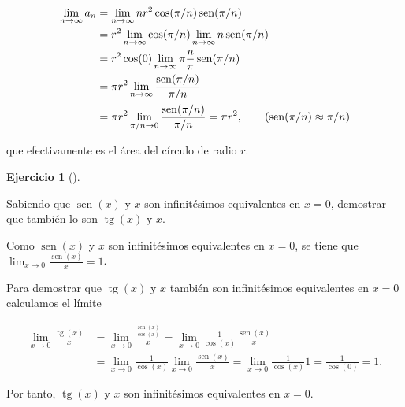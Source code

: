 \documentclass[
  a4paper,
]{scrreport}
\theoremstyle{definition}
\newtheorem{exercise}{Ejercicio}[chapter]
\theoremstyle{remark}
\begin{document}
\begin{tcolorbox}
\begin{enumerate}
  \begin{align*}
   \lim_{n\to\infty} a_n &= \lim_{n\to\infty} n r^2\cos(\pi/n)\operatorname{sen}(\pi/n)\\ 
   &= r^2 \lim_{n\to\infty}\cos(\pi/n)\lim_{n\to\infty}n\operatorname{sen}(\pi/n) \\ 
   &= r^2 \cos(0)\lim_{n\to\infty}\pi\frac{n}{\pi}\operatorname{sen}(\pi/n) \\ 
   &= \pi r^2 \lim_{n\to\infty}\frac{\operatorname{sen}(\pi/n)}{\pi/n} \\
   &= \pi r^2 \lim_{\pi/n\to 0} \frac{\operatorname{sen}(\pi/n)}{\pi/n} = \pi r^2, \tag{$\operatorname{sen}(\pi/n)\approx \pi/n$}
   \end{align*}

  que efectivamente es el área del círculo de radio \(r\).
\end{enumerate}

\end{tcolorbox}

\leavevmode{}%
\begin{exercise}[]\label{exr-3}

Sabiendo que \(\operatorname{sen}(x)\) y \(x\) son infinitésimos
equivalentes en \(x=0\), demostrar que también lo son
\(\operatorname{tg}(x)\) y \(x\).

\end{exercise}

\begin{tcolorbox}[enhanced jigsaw, colframe=quarto-callout-tip-color-frame, opacitybacktitle=0.6, colbacktitle=quarto-callout-tip-color!10!white, rightrule=.15mm, toptitle=1mm, opacityback=0, title=\textcolor{quarto-callout-tip-color}{\faLightbulb}\hspace{0.5em}{Solución}, arc=.35mm, toprule=.15mm, breakable, bottomtitle=1mm, titlerule=0mm, bottomrule=.15mm, leftrule=.75mm, coltitle=black, left=2mm, colback=white]

Como \(\operatorname{sen}(x)\) y \(x\) son infinitésimos equivalentes en
\(x=0\), se tiene que
\(\lim_{x\to 0}\frac{\operatorname{sen}(x)}{x} = 1\).

Para demostrar que \(\operatorname{tg}(x)\) y \(x\) también son
infinitésimos equivalentes en \(x=0\) calculamos el límite

\begin{align*}
\lim_{x\to 0}\frac{\operatorname{tg}(x)}{x} &= \lim_{x\to 0}\frac{\frac{\operatorname{sen}(x)}{\cos(x)}}{x} = \lim_{x\to 0}\frac{1}{\cos(x)}\frac{\operatorname{sen}(x)}{x} \\
&= \lim_{x\to 0}\frac{1}{\cos(x)}\lim_{x\to 0}\frac{\operatorname{sen}(x)}{x} = \lim_{x\to 0}\frac{1}{\cos(x)} 1 = \frac{1}{\cos(0)} = 1.
\end{align*}

Por tanto, \(\operatorname{tg}(x)\) y \(x\) son infinitésimos
equivalentes en \(x=0\).

\end{tcolorbox}
\end{document}
